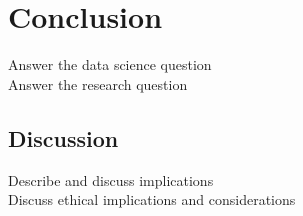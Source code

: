 

\chapter{Conclusion}
\label{chap:conclusion}
\pagestyle{fancy}

Answer the data science question \\
Answer the research question \\

\section{Discussion}
Describe and discuss implications \\
Discuss ethical implications and considerations